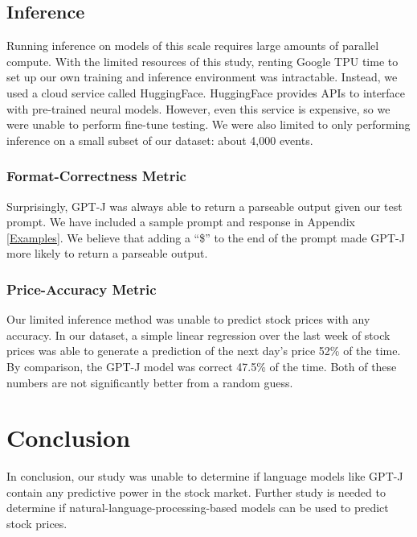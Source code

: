 \documentclass[conference]{IEEEtran}
\begin{document}
\subsection{Inference}
Running inference on models of this scale requires large amounts of parallel compute. With the limited resources of this study, renting Google TPU time to set up our own training and inference environment was intractable. Instead, we used a cloud service called HuggingFace. HuggingFace provides APIs to interface with pre-trained neural models. However, even this service is expensive, so we were unable to perform fine-tune testing. We were also limited to only performing inference on a small subset of our dataset: about 4,000 events.
\subsubsection{Format-Correctness Metric}
Surprisingly, GPT-J was always able to return a parseable output given our test prompt. We have included a sample prompt and response in Appendix \ref{Examples}. We believe that adding a ``\$'' to the end of the prompt made GPT-J more likely to return a parseable output.
\subsubsection{Price-Accuracy Metric}
Our limited inference method was unable to predict stock prices with any accuracy. In our dataset, a simple linear regression over the last week of stock prices was able to generate a prediction of the next day's price 52\% of the time. By comparison, the GPT-J model was correct 47.5\% of the time. Both of these numbers are not significantly better from a random guess. 
\section{Conclusion}
In conclusion, our study was unable to determine if language models like GPT-J contain any predictive power in the stock market. Further study is needed to determine if natural-language-processing-based models can be used to predict stock prices.
\end{document}
